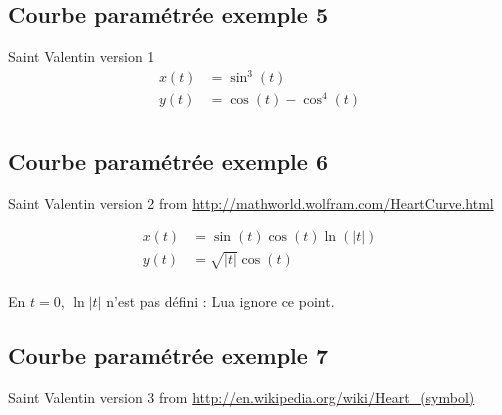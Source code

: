 \newpage
\subsection{Courbe paramétrée exemple 5}
Saint Valentin version 1
\begin{align*}
x(t) &=\sin^3(t)\\
y(t) &=\cos(t)-\cos^4(t)\\
\end{align*}

\begin{center}
\begin{tkzexample}[vbox]
\end{tkzexample}
\end{center}

\newpage
\subsection{Courbe paramétrée exemple 6}
Saint Valentin version 2 from  \url{http://mathworld.wolfram.com/HeartCurve.html}

\begin{align*}
x(t) &=\sin(t)\cos(t)\ln(\lvert t\rvert)\\
y(t) &=\sqrt{\lvert t\rvert}\cos(t)\\
\end{align*}

\begin{center}
\begin{tkzexample}[vbox]
\end{tkzexample}
\end{center}

\tkzHand En $t=0$, $\ln\lvert t\rvert$ n'est pas défini : Lua ignore ce point.

\newpage
\subsection{Courbe paramétrée exemple 7}
Saint Valentin version 3 from  \url{http://en.wikipedia.org/wiki/Heart_(symbol)}

